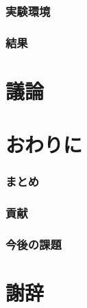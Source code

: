\documentclass[a4paper,11pt]{jsarticle}
\begin{document}
\section{実験環境}
\section{結果}

\newpage
\part{議論}

\newpage
\part{おわりに}
\section{まとめ}
\section{貢献}
\section{今後の課題}

\newpage
\part*{謝辞}
\end{document}
